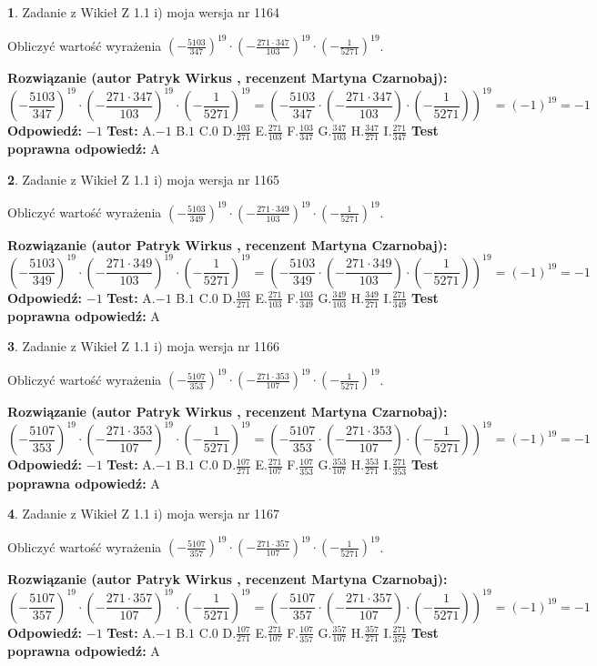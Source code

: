 \documentclass[12pt, a4paper]{article}
\theoremstyle{definition} %
\newtheorem{zad}{}
\newcommand{\zadStart}[1]{\begin{zad}#1\newline}
\newcommand{\zadStop}{\end{zad}}
\newcommand{\rozwStart}[2]{\noindent \textbf{Rozwiązanie (autor #1 , recenzent #2): }\newline}
\newcommand{\rozwStop}{\newline}
\newcommand{\odpStart}{\noindent \textbf{Odpowiedź:}\newline}
\newcommand{\odpStop}{\newline}
\newcommand{\testStart}{\noindent \textbf{Test:}\newline}
\newcommand{\testStop}{\newline}
\newcommand{\kluczStart}{\noindent \textbf{Test poprawna odpowiedź:}\newline}
\newcommand{\kluczStop}{\newline}
\begin{document}
\zadStart{Zadanie z Wikieł Z 1.1 i) moja wersja nr 1164}

Obliczyć wartość wyrażenia $(-\frac{5103}{347})^{19} \cdot (-\frac{271 \cdot 347}{103})^{19} \cdot (-\frac{1}{5271})^{19}$.
\zadStop
\rozwStart{Patryk Wirkus}{Martyna Czarnobaj}
$$(-\frac{5103}{347})^{19} \cdot (-\frac{271 \cdot 347}{103})^{19} \cdot (-\frac{1}{5271})^{19} = (-\frac{5103}{347} \cdot (-\frac{271 \cdot 347}{103}) \cdot (-\frac{1}{5271}))^{19} = (-1)^{19} = -1$$
\rozwStop
\odpStart
$-1$
\odpStop
\testStart
A.$-1$ B.$1$ C.$0$ D.$\frac{103}{271}$ E.$\frac{271}{103}$
F.$\frac{103}{347}$ G.$\frac{347}{103}$
H.$\frac{347}{271}$
I.$\frac{271}{347}$
\testStop
\kluczStart
A
\kluczStop



\zadStart{Zadanie z Wikieł Z 1.1 i) moja wersja nr 1165}

Obliczyć wartość wyrażenia $(-\frac{5103}{349})^{19} \cdot (-\frac{271 \cdot 349}{103})^{19} \cdot (-\frac{1}{5271})^{19}$.
\zadStop
\rozwStart{Patryk Wirkus}{Martyna Czarnobaj}
$$(-\frac{5103}{349})^{19} \cdot (-\frac{271 \cdot 349}{103})^{19} \cdot (-\frac{1}{5271})^{19} = (-\frac{5103}{349} \cdot (-\frac{271 \cdot 349}{103}) \cdot (-\frac{1}{5271}))^{19} = (-1)^{19} = -1$$
\rozwStop
\odpStart
$-1$
\odpStop
\testStart
A.$-1$ B.$1$ C.$0$ D.$\frac{103}{271}$ E.$\frac{271}{103}$
F.$\frac{103}{349}$ G.$\frac{349}{103}$
H.$\frac{349}{271}$
I.$\frac{271}{349}$
\testStop
\kluczStart
A
\kluczStop



\zadStart{Zadanie z Wikieł Z 1.1 i) moja wersja nr 1166}

Obliczyć wartość wyrażenia $(-\frac{5107}{353})^{19} \cdot (-\frac{271 \cdot 353}{107})^{19} \cdot (-\frac{1}{5271})^{19}$.
\zadStop
\rozwStart{Patryk Wirkus}{Martyna Czarnobaj}
$$(-\frac{5107}{353})^{19} \cdot (-\frac{271 \cdot 353}{107})^{19} \cdot (-\frac{1}{5271})^{19} = (-\frac{5107}{353} \cdot (-\frac{271 \cdot 353}{107}) \cdot (-\frac{1}{5271}))^{19} = (-1)^{19} = -1$$
\rozwStop
\odpStart
$-1$
\odpStop
\testStart
A.$-1$ B.$1$ C.$0$ D.$\frac{107}{271}$ E.$\frac{271}{107}$
F.$\frac{107}{353}$ G.$\frac{353}{107}$
H.$\frac{353}{271}$
I.$\frac{271}{353}$
\testStop
\kluczStart
A
\kluczStop



\zadStart{Zadanie z Wikieł Z 1.1 i) moja wersja nr 1167}

Obliczyć wartość wyrażenia $(-\frac{5107}{357})^{19} \cdot (-\frac{271 \cdot 357}{107})^{19} \cdot (-\frac{1}{5271})^{19}$.
\zadStop
\rozwStart{Patryk Wirkus}{Martyna Czarnobaj}
$$(-\frac{5107}{357})^{19} \cdot (-\frac{271 \cdot 357}{107})^{19} \cdot (-\frac{1}{5271})^{19} = (-\frac{5107}{357} \cdot (-\frac{271 \cdot 357}{107}) \cdot (-\frac{1}{5271}))^{19} = (-1)^{19} = -1$$
\rozwStop
\odpStart
$-1$
\odpStop
\testStart
A.$-1$ B.$1$ C.$0$ D.$\frac{107}{271}$ E.$\frac{271}{107}$
F.$\frac{107}{357}$ G.$\frac{357}{107}$
H.$\frac{357}{271}$
I.$\frac{271}{357}$
\testStop
\kluczStart
A
\kluczStop
\end{document}
